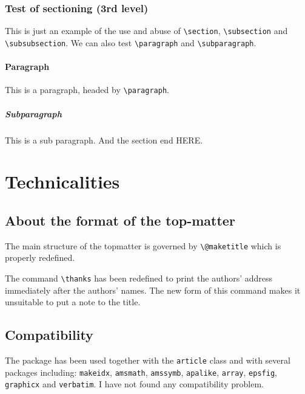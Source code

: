 \documentclass[a4paper,twocolumn,10pt]{article} %
\begin{document}
\subsubsection{Test of sectioning (3rd level)} 
This is just an example of the use and abuse 
of \verb+\section+, \verb+\subsection+ and
\verb+\subsubsection+. We can also test \verb+\paragraph+ and 
\verb+\subparagraph+.
\paragraph{Paragraph} This is a paragraph, headed by \verb+\paragraph+.
\subparagraph{Subparagraph} This is a  sub paragraph. And the section 
end HERE. 
\section{Technicalities}
\subsection{About the format of the top-matter}
The main structure of the topmatter is governed by \verb+\@maketitle+ 
which is properly redefined.  \par\noindent
The command \verb+\thanks+ has been 
redefined to print the authors' address immediately after the 
authors' names. The  new form of this command makes it unsuitable 
to put a note to the title.
\subsection{Compatibility}
The package has been used together with the \texttt{article} class 
and with several packages including:  
\texttt{makeidx}, \texttt{amsmath}, 
\texttt{amssymb}, \texttt{apalike}, \texttt{array}, 
\texttt{epsfig}, \texttt{graphicx} and \texttt{verbatim}.
I have not found any compatibility problem.
\end{document}
